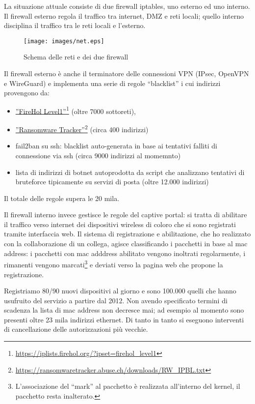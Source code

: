La situazione attuale consiste di due firewall iptables, uno esterno ed uno
interno.  Il firewall esterno regola il traffico tra internet, DMZ e reti
locali; quello interno disciplina il traffico tra le reti locali e l'esterno.
\begin{figure}[H]
\begin{center}
    \texttt{[image: images/net.eps]}
    \caption{Schema delle reti e dei due firewall}
    \label{fig:rete}
\end{center}
\end{figure}
\noindent Il firewall esterno \`e anche il terminatore delle connessioni VPN (IPsec,
OpenVPN e WireGuard) e implementa una serie di regole ``blacklist'' i cui
indirizzi provengono da:
\begin{itemize}
    \item \href{https://iplists.firehol.org/?ipset=firehol\_level1}{''FireHol
        Level1''}\footnote{\url{https://iplists.firehol.org/?ipset=firehol\_level1}} (oltre
    7000 sottoreti),
    \item \href{https://ransomwaretracker.abuse.ch/downloads/RW\_IPBL.txt}{''Ransomware
        Tracker''}\footnote{\url{https://ransomwaretracker.abuse.ch/downloads/RW\_IPBL.txt}}
    (circa 400 indirizzi)
    \item fail2ban su ssh: blacklist auto-generata in base ai tentativi
    falliti di connessione via ssh (circa 9000 indirizzi al momemnto)
    \item lista di indirizzi di botnet autoprodotta da script che analizzano
    tentativi di bruteforce tipicamente su servizi di posta (oltre 12.000
    indirizzi)
\end{itemize}
Il totale delle regole supera le 20 mila.

Il firewall interno invece gestisce le regole del captive portal: si tratta di
abilitare il traffico verso internet dei dispositivi wireless di coloro che si
sono registrati tramite interfaccia web.
Il sistema di registrazione e abilitazione, che ho realizzato con la
collaborazione di un collega, agisce classificando i pacchetti in base al mac
address: i pacchetti con mac adddress abilitato vengono inoltrati
regolarmente, i rimanenti vengono marcati\footnote{L'associazione del ``mark''
al pacchetto è realizzata all'interno del kernel, il pacchetto resta
inalterato.} e deviati verso la pagina web che propone la registrazione.

Registriamo 80/90 nuovi dispositivi al giorno e sono 100.000 quelli
che hanno usufruito del servizio a partire dal 2012.  Non avendo specificato
termini di scadenza la lista di mac address non decresce mai; ad esempio al
momento sono presenti oltre 23 mila indirizzi ethernet.  Di tanto in tanto si
eseguono interventi di cancellazione delle autorizzazioni pi\`u vecchie.

